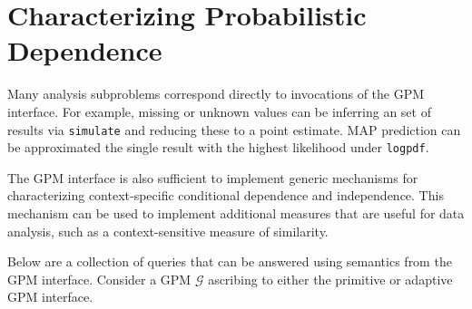 \documentclass[10pt,letterpaper]{article}
\newcommand{\G}{\mathcal{G}}
\begin{document}
\section{Characterizing Probabilistic Dependence}

Many analysis subproblems correspond directly to invocations of the GPM
interface. For example, missing or unknown values can be inferring an set of
results via \texttt{simulate} and reducing these to a point estimate. MAP
prediction can be approximated the single result with the highest likelihood
under \texttt{logpdf}.

The GPM interface is also sufficient to implement generic mechanisms for
characterizing context-specific conditional dependence and independence. This
mechanism can be used to implement additional measures that are useful for data
analysis, such as a context-sensitive measure of similarity.

Below are a collection of queries that can be answered using semantics from the
GPM interface. Consider a GPM $\G$ ascribing to either the primitive or
adaptive GPM interface.
\end{document}
